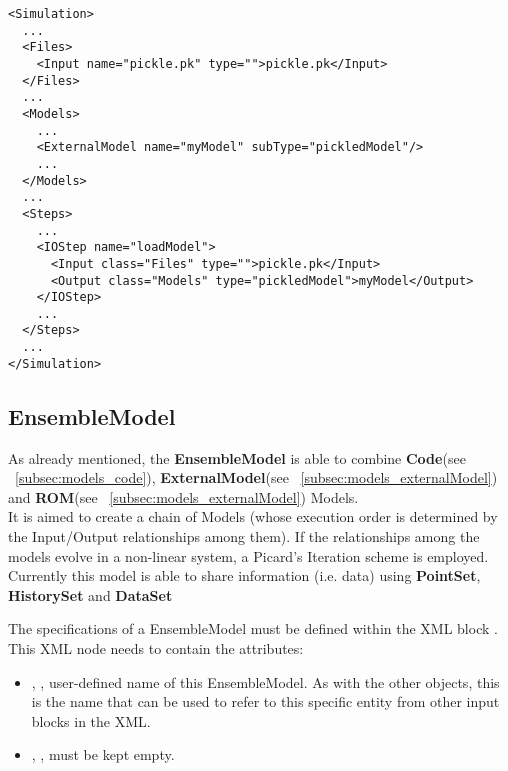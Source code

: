 {\footnotesize
\begin{lstlisting}[style=XML,morekeywords={name,subType}]
<Simulation>
  ...
  <Files>
    <Input name="pickle.pk" type="">pickle.pk</Input>
  </Files>
  ...
  <Models>
    ...
    <ExternalModel name="myModel" subType="pickledModel"/>
    ...
  </Models>
  ...
  <Steps>
    ...
    <IOStep name="loadModel">
      <Input class="Files" type="">pickle.pk</Input>
      <Output class="Models" type="pickledModel">myModel</Output>
    </IOStep>
    ...
  </Steps>
  ...
</Simulation>
\end{lstlisting}
}

%
%

\subsection{EnsembleModel}
\label{subsec:models_EnsembleModel}
As already mentioned, the \textbf{EnsembleModel} is able to combine \textbf{Code}(see ~\ref{subsec:models_code}),
\textbf{ExternalModel}(see ~\ref{subsec:models_externalModel}) and \textbf{ROM}(see ~\ref{subsec:models_externalModel}) Models.
\\It is aimed to create a chain of Models (whose execution order is determined by the Input/Output relationships among them).
  If the relationships among the models evolve in a non-linear system, a Picard's Iteration scheme is employed.
\\Currently this model is able to share information (i.e. data) using \textbf{PointSet},  \textbf{HistorySet} and \textbf{DataSet}

The specifications of a EnsembleModel must be defined within the XML block
.
%
This XML node needs to contain the attributes:

\vspace{-5mm}
\begin{itemize}
  \itemsep0em
  \item {}, , user-defined name
  of this EnsembleModel.
  \nb As with the other objects, this is the name that can be used to refer to
  this specific entity from other input blocks in the XML.
  \item {}, , must be kept
  empty.
\end{itemize}
\vspace{-5mm}

